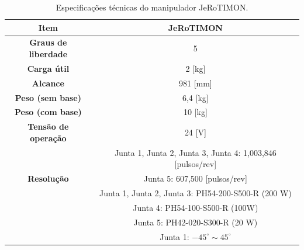   \begin{table}[H]
    \caption{Especificações técnicas do manipulador JeRoTIMON.}
    \begin{tabular}{|c|c|}
    \hline
    \rowcolor[HTML]{EFEFEF} 
    \textbf{Item}                                              & \textbf{JeRoTIMON}                                             \\ \hline
    \textbf{Graus de liberdade}                                & 5                                                              \\ \hline
    \rowcolor[HTML]{EFEFEF} 
    \textbf{Carga útil}                                        & 2 {[}kg{]}                                                     \\ \hline
    \textbf{Alcance}                                           & 981 {[}mm{]}                                                   \\ \hline
    \rowcolor[HTML]{EFEFEF} 
    \textbf{Peso (sem base)}                                   & 6,4 {[}kg{]}                                                   \\ \hline
    \textbf{Peso (com base)}                                   & 10 {[}kg{]}                                                    \\ \hline
    \rowcolor[HTML]{EFEFEF} 
    \textbf{Tensão de operação}                                & 24 {[}V{]}                                                     \\ \hline
                                                               & Junta 1, Junta 2, Junta 3, Junta 4: 1,003,846 {[}pulsos/rev{]} \\ \cline{2-2} 
    \multirow{-2}{*}{\textbf{Resolução}}                       & Junta 5: 607,500 {[}pulsos/rev{]}                              \\ \hline
    \rowcolor[HTML]{EFEFEF} 
    \cellcolor[HTML]{EFEFEF}                                   & Junta 1, Junta 2, Junta 3: PH54-200-S500-R (200 W)             \\ \cline{2-2} 
    \rowcolor[HTML]{EFEFEF} 
    \cellcolor[HTML]{EFEFEF}                                   & Junta 4: PH54-100-S500-R (100W)                                \\ \cline{2-2} 
    \rowcolor[HTML]{EFEFEF} 
    \multirow{-3}{*}{\cellcolor[HTML]{EFEFEF}\textbf{Motores}} & Junta 5: PH42-020-S300-R (20 W)                                \\ \hline
                                                               & Junta 1: $ -45^\circ \sim 45^\circ $                           \\ \cline{2-2} 

\end{tabular}
\end{table}
